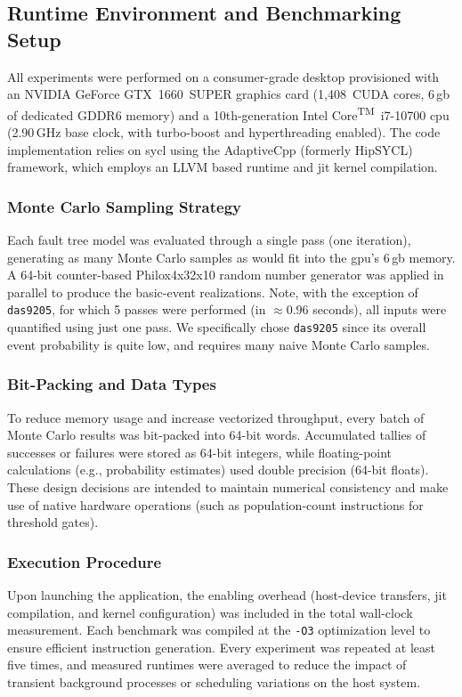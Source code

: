\subsection{Runtime Environment and Benchmarking Setup}
\label{subsec:runtime_environment}

All experiments were performed on a consumer-grade desktop provisioned with an NVIDIA\textsuperscript{\textregistered} GeForce GTX~1660~SUPER graphics card (1{,}408~CUDA cores, 6\,\acrshort{gb} of dedicated GDDR6 memory) and a 10th-generation Intel\textsuperscript{\textregistered} Core\textsuperscript{TM}~i7-10700 \acrshort{cpu} (2.90\,GHz base clock, with turbo-boost and hyperthreading enabled). The code implementation relies on \acrshort{sycl} using the AdaptiveCpp (formerly HipSYCL) framework, which employs an LLVM based runtime and \acrfull{jit} kernel compilation.

\subsubsection*{Monte Carlo Sampling Strategy}
Each fault tree model was evaluated through a single pass (one iteration), generating as many Monte Carlo samples as would fit into the \acrshort{gpu}'s 6\,\acrshort{gb} memory. A 64-bit counter-based Philox4x32x10 random number generator was applied in parallel to produce the basic-event realizations. Note, with the exception of \texttt{das9205}, for which 5 passes were performed (in $\approx 0.96$ seconds), all inputs were quantified using just one pass. We specifically chose \texttt{das9205} since its overall event probability is quite low, and requires many naive Monte Carlo samples.

\subsubsection*{Bit-Packing and Data Types}
To reduce memory usage and increase vectorized throughput, every batch of Monte Carlo results was bit-packed into 64-bit words. Accumulated tallies of successes or failures were stored as 64-bit integers, while floating-point calculations (e.g., probability estimates) used double precision (64-bit floats). These design decisions are intended to maintain numerical consistency and make use of native hardware operations (such as population-count instructions for threshold gates).

\subsubsection*{Execution Procedure}
Upon launching the application, the enabling overhead (host-device transfers, \acrshort{jit} compilation, and kernel configuration) was included in the total wall-clock measurement. Each benchmark was compiled at the \texttt{-O3} optimization level to ensure efficient instruction generation. Every experiment was repeated at least five times, and measured runtimes were averaged to reduce the impact of transient background processes or scheduling variations on the host system.

